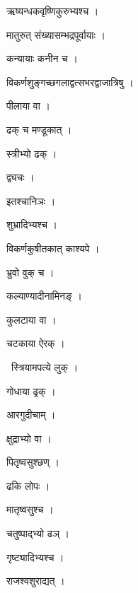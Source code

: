 \documentclass[10pt, openany, oneside]{book}
\begin{document}
\noindent ऋष्यन्धकवृष्णिकुरुभ्यश्च ।

\noindent मातुरुत् संख्यासम्भद्रपूर्वायाः ।

\noindent कन्यायाः कनीन च ।

\noindent विकर्णशुङ्गच्छगलाद्वत्सभरद्वाजात्रिषु ।

\noindent पीलाया वा ।

\noindent ढक् च मण्डूकात् ।

\noindent स्त्रीभ्यो ढक् ।

\noindent द्व्यचः ।

\noindent इतश्चानिञः ।

\noindent शुभ्रादिभ्यश्च ।

\noindent विकर्णकुषीतकात् काश्यपे ।

\noindent भ्रुवो वुक् च ।

\noindent कल्याण्यादीनामिनङ् ।

\noindent कुलटाया वा ।

\noindent चटकाया ऐरक् ।

\par\noindent\hspace{1.5em}{\vps वा॰}~{\qt स्त्रियामपत्ये लुक् ।}

\noindent गोधाया ढ्रक् ।

\noindent आरगुदीचाम् ।

\noindent क्षुद्राभ्यो वा ।

\noindent पितृष्वसुश्छण् ।

\noindent ढकि लोपः ।

\noindent मातृष्वसुश्च ।

\noindent चतुष्पाद्भ्यो ढञ् ।

\noindent गृष्ट्यादिभ्यश्च ।

\noindent राजश्वशुराद्यत् ।
\end{document}
